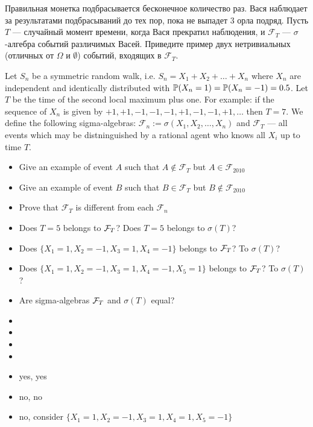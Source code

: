 \begin{problem}
Правильная монетка подбрасывается бесконечное количество раз. Вася наблюдает за результатами подбрасываний до тех пор, пока не выпадет 3 орла подряд. Пусть $T$ — случайный момент времени, когда Вася прекратил наблюдения, и $ \mathcal{F}_{T}$ — $\sigma$-алгебра событий различимых Васей. Приведите пример двух нетривиальных (отличных от $ \Omega$ и  $\emptyset$) событий, входящих в $\mathcal{F}_T$.

\begin{sol}

\end{sol}
\end{problem}

\begin{problem}
Let $S_{n}$ be a symmetric random walk, i.e. $ S_{n}=X_{1}+X_{2}+\ldots+X_{n} $ where $ X_{n} $ are independent and identically distributed with $ \P(X_{n}=1)=\P(X_{n}=-1)=0.5 $. Let $T$ be the time of the second local maximum plus one. For example: if the sequence of $ X_{n} $ is given by $ +1,+1,-1,-1,-1,+1,-1,-1,+1,\ldots$ then $T=7$. We define the following sigma-algebras: $ \mathcal{F}_{n}:=\sigma(X_{1},X_{2},\ldots,X_{n})$ and $ \mathcal{F}_{T} $ — all events which may be distninguished by a rational agent who knows all $ X_{i} $ up to time $ T $.
\begin{itemize}
\item Give an example of event $A$ such that $ A\notin \mathcal{F}_{T} $ but $ A\in \mathcal{F}_{2010} $
\item Give an example of event $B$ such that $ B\in \mathcal{F}_{T} $ but $ B\notin \mathcal{F}_{2010} $
\item Prove that $ \mathcal{F}_{T} $ is different from each $ \mathcal{F}_{n} $
\item Does $T=5$ belongs to $\cF_T$? Does $T=5$ belongs to $\sigma(T)$?
\item Does $\{X_1 = 1, X_2 = -1, X_3 = 1, X_4 = -1 \}$ belongs to $\cF_T$? To $\sigma(T)$?
\item Does $\{X_1 = 1, X_2 = -1, X_3 = 1, X_4 = -1, X_5 = 1 \}$ belongs to $\cF_T$? To $\sigma(T)$?
\item Are sigma-algebras $\cF_T$ and $\sigma(T)$ equal?
\end{itemize}


\begin{sol}
  \begin{itemize}
    \item
    \item
    \item
    \item
    \item yes, yes
    \item no, no
    \item no, consider $\{X_1 = 1, X_2 = -1, X_3 = 1, X_4 = 1, X_5 = -1 \}$
  \end{itemize}
\end{sol}
\end{problem}

